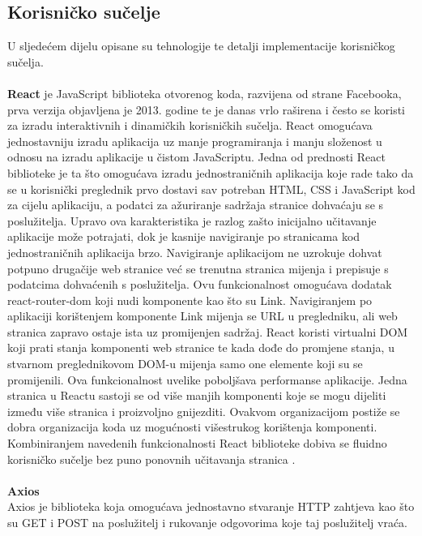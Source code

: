 \documentclass[times, utf8, zavrsni]{fer}
\begin{document}
\subsection{Korisničko sučelje}
U sljedećem dijelu opisane su tehnologije te detalji implementacije korisničkog sučelja.
\\
\\ \textbf{React} je JavaScript biblioteka otvorenog koda, razvijena od strane Facebooka,
prva verzija objavljena je 2013. godine te je danas vrlo raširena i često se koristi za izradu interaktivnih i dinamičkih korisničkih sučelja. 
React omogućava jednostavniju izradu aplikacija uz manje programiranja i manju složenost u odnosu na izradu aplikacije u čistom JavaScriptu.
Jedna od prednosti React biblioteke je ta što omogućava izradu jednostraničnih aplikacija  koje rade tako 
da se u korisnički preglednik prvo dostavi 
sav potreban HTML, CSS i JavaScript kod za cijelu aplikaciju, a podatci za ažuriranje sadržaja stranice dohvaćaju se 
s poslužitelja. Upravo ova karakteristika je razlog zašto inicijalno učitavanje aplikacije može potrajati, dok je kasnije navigiranje po stranicama kod jednostraničnih aplikacija brzo.
Navigiranje aplikacijom ne uzrokuje dohvat potpuno drugačije web stranice već se trenutna stranica 
mijenja i prepisuje s podatcima dohvaćenih s poslužitelja. Ovu funkcionalnost omogućava dodatak react-router-dom koji nudi komponente kao što su Link.
Navigiranjem po aplikaciji korištenjem komponente Link mijenja se URL u pregledniku, ali web stranica zapravo ostaje ista uz promijenjen sadržaj.
React koristi virtualni DOM  koji prati stanja 
komponenti web stranice te kada dođe do promjene stanja, u stvarnom preglednikovom DOM-u mijenja samo one elemente koji su se promijenili. Ova 
funkcionalnost uvelike poboljšava performanse aplikacije.
Jedna stranica u Reactu sastoji se od više manjih komponenti koje se mogu dijeliti \\između više stranica i proizvoljno gnijezditi. Ovakvom organizacijom
postiže se dobra organizacija koda uz mogućnosti višestrukog korištenja komponenti.
Kombiniranjem navedenih funkcionalnosti React biblioteke dobiva se fluidno korisničko sučelje bez puno ponovnih učitavanja stranica .
\\
\\ \textbf{Axios}
\\ Axios je biblioteka koja omogućava jednostavno stvaranje HTTP zahtjeva kao što su GET i POST na poslužitelj i rukovanje odgovorima koje taj poslužitelj vraća.
\end{document}
